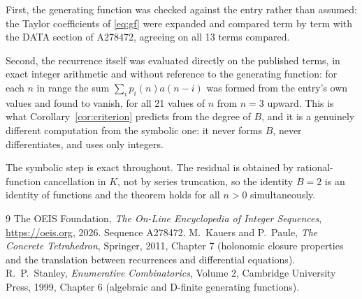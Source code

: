 \documentclass[11pt,a4paper]{article}
\theoremstyle{plain}
\theoremstyle{definition}
\begin{document}
First, the generating function was checked against the entry rather than assumed: the
Taylor coefficients of \eqref{eq:gf} were expanded and compared term by term with the DATA
section of A278472, agreeing on all 13 terms compared.

Second, the recurrence itself was evaluated directly on the published terms, in exact
integer arithmetic and without reference to the generating function: for each $n$ in range
the sum $\sum_{i}p_{i}(n)a(n-i)$ was formed from the entry's own values and found to
vanish, for all 21 values of $n$ from $n=3$ upward. This is what
Corollary~\ref{cor:criterion} predicts from the degree of $B$, and it is a genuinely
different computation from the symbolic one: it never forms $B$, never differentiates, and
uses only integers.

The symbolic step is exact throughout. The residual is obtained by rational-function
cancellation in $K$, not by series truncation, so the identity $B=2$ is an
identity of functions and the theorem holds for all $n>0$ simultaneously.

\begin{thebibliography}{9}
 The OEIS Foundation, \emph{The On-Line Encyclopedia of Integer Sequences},
\url{https://oeis.org}, 2026. Sequence A278472.
 M.~Kauers and P.~Paule, \emph{The Concrete Tetrahedron}, Springer, 2011,
Chapter 7 (holonomic closure properties and the translation between recurrences and
differential equations).
 R.~P.~Stanley, \emph{Enumerative Combinatorics}, Volume 2, Cambridge
University Press, 1999, Chapter 6 (algebraic and D-finite generating functions).
\end{thebibliography}
\end{document}
